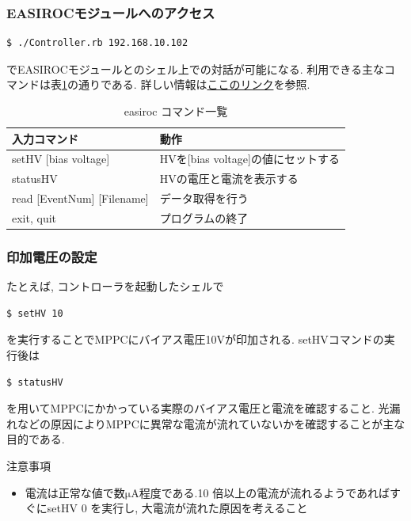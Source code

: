 \subsubsection{EASIROCモジュールへのアクセス}
\begin{lstlisting}
$ ./Controller.rb 192.168.10.102
\end{lstlisting}
でEASIROCモジュールとのシェル上での対話が可能になる.
利用できる主なコマンドは表\ref{table:easiroc_controller_commands}の通りである.
詳しい情報は\href{https://ppwww.phys.sci.kobe-u.ac.jp/~hamada/easiroc_manual.html}{ここのリンク}を参照.

\begin{table}[htbp]
  \begin{center}
    \caption{easiroc コマンド一覧}
    \label{table:easiroc_controller_commands}
    \begin{tabular}{|l|l|} \hline
      入力コマンド & 動作                                                     \\ \hline \hline
      setHV [bias voltage] & HVを[bias voltage]の値にセットする\\ \hline
      statusHV & HVの電圧と電流を表示する\\ \hline
      read [EventNum] [Filename] & データ取得を行う \\ \hline
      exit, quit & プログラムの終了\\ \hline
    \end{tabular}
  \end{center}
\end{table}

\subsubsection{印加電圧の設定}

たとえば, コントローラを起動したシェルで
\begin{lstlisting}
$ setHV 10
\end{lstlisting}
を実行することでMPPCにバイアス電圧10Vが印加される.
setHVコマンドの実行後は
\begin{lstlisting}
$ statusHV
\end{lstlisting}
を用いてMPPCにかかっている実際のバイアス電圧と電流を確認すること.
光漏れなどの原因によりMPPCに異常な電流が流れていないかを確認することが主な目的である.

\begin{itembox}[l]{注意事項}
  \begin{itemize}
    \item 電流は正常な値で数$\mathrm{\mu A}$程度である.10 倍以上の電流が流れるようであればすぐにsetHV 0 を実行し, 大電流が流れた原因を考えること
  \end{itemize}
\end{itembox}

